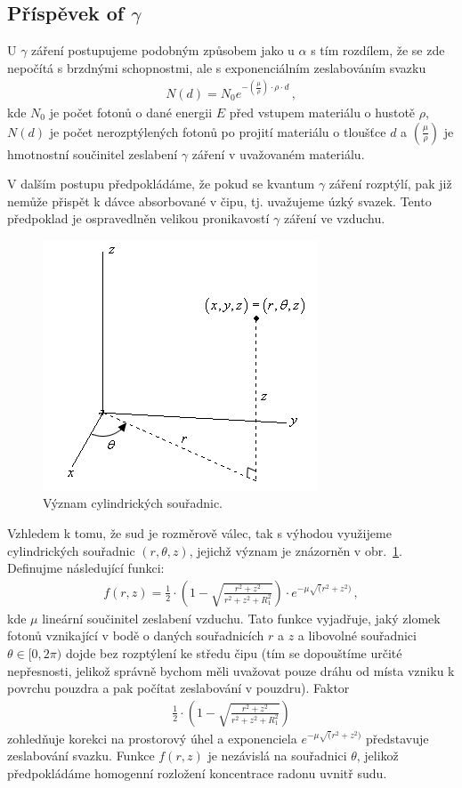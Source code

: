 \documentclass[11pt,a4paper]{article}
\begin{document}
\subsection{Příspěvek of $\gamma$}
U $\gamma$ záření postupujeme podobným způsobem jako u $\alpha$ s tím rozdílem, že se zde nepočítá s brzdnými schopnostmi, ale s exponenciálním zeslabováním svazku
\begin{align}
	N(d)=N_0e^{-\left(\frac{\mu}{\rho}\right)\cdot\rho\cdot d}\,,
\end{align}
kde $N_0$ je počet fotonů o dané energii $E$ před vstupem materiálu o hustotě $\rho$, $N(d)$ je počet nerozptýlených fotonů po projití materiálu o tloušťce $d$ a $\left(\frac{\mu}{\rho}\right)$ je hmotnostní součinitel zeslabení $\gamma$ záření v uvažovaném materiálu. 

V dalším postupu předpokládáme, že pokud se kvantum $\gamma$ záření rozptýlí, pak již nemůže přispět k dávce absorbované v čipu, tj. uvažujeme úzký svazek. Tento předpoklad je ospravedlněn velikou pronikavostí $\gamma$ záření ve vzduchu.

\begin{figure}[ht]
	\centering
	\includegraphics[width=0.4\linewidth]{valcove_souradnice.png}
	\caption{Význam cylindrických souřadnic. \cite{valcovesouradnice}}
	\label{fig:valcovesouradnice}
\end{figure}
Vzhledem k tomu, že sud je rozměrově válec, tak s výhodou využijeme cylindrických souřadnic $(r,\theta, z)$, jejichž význam je znázorněn v obr.~\ref{fig:valcovesouradnice}. 
Definujme následující funkci:
\begin{align}
	f(r,z)=\frac{1}{2}\cdot\left(1-\sqrt{\frac{r^2+z^2}{r^2+z^2+R_1^2}}\right)\cdot e^{-\mu\sqrt(r^2+z^2)}\,,\label{eq:gama_geometrie}
\end{align}
kde $\mu$ lineární součinitel zeslabení vzduchu. Tato funkce vyjadřuje, jaký zlomek fotonů vznikající v bodě o daných souřadnicích $r$ a $z$ a libovolné souřadnici $\theta\in[0,2\pi)$ dojde bez rozptýlení ke středu čipu (tím se dopouštíme určité nepřesnosti, jelikož správně bychom měli uvažovat pouze dráhu od místa vzniku k povrchu pouzdra a pak počítat zeslabování v pouzdru). Faktor 
\begin{align}
	\frac{1}{2}\cdot\left(1-\sqrt{\frac{r^2+z^2}{r^2+z^2+R_1^2}}\right)
\end{align}
zohledňuje korekci na prostorový úhel a exponenciela $e^{-\mu\sqrt(r^2+z^2)}$ představuje zeslabování svazku. Funkce $f(r,z)$ je nezávislá na souřadnici $\theta$, jelikož předpokládáme homogenní rozložení koncentrace radonu uvnitř sudu.
\end{document}
